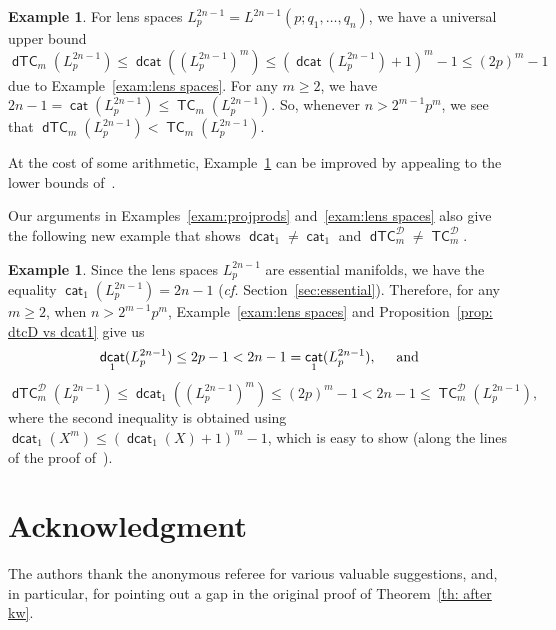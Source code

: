 \documentclass[amscd,amssymb,verbatim,11pt]{amsart}
\theoremstyle{plain}
\theoremstyle{definition}
\newtheorem{ex}[thm]{Example}
\DeclareMathOperator{\cat}{{\mathsf{cat}}}
\DeclareMathOperator{\TC}{{\mathsf{TC}}}
\DeclareMathOperator{\dcat}{{\mathsf{dcat}}}
\DeclareMathOperator{\dTC}{{\mathsf{dTC}}}
\newcommand{\D}{\mathcal{D}}
\def\Z{{\mathbb Z}}
\def\R{{\mathbb R}}
\begin{document}
\begin{ex}\label{exam: dtc and tc differ-2}
    For lens spaces $L^{2n-1}_p=L^{2n-1}(p;q_1,\ldots,q_n)$, we have a universal upper bound 
    \[
    \dTC_m(L^{2n-1}_p)\le\dcat((L^{2n-1}_p)^m)\le (\dcat(L^{2n-1}_p)+1)^m-1\le (2p)^m-1
    \]
    due to Example~\ref{exam:lens spaces}. For any $m\ge 2$, we have $2n-1=\cat(L^{2n-1}_p)\le\TC_m(L^{2n-1}_p)$. So, whenever $n>2^{m-1}p^m$, we see that $\dTC_m(L^{2n-1}_p)<\TC_m(L^{2n-1}_p)$.
\end{ex}

At the cost of some arithmetic, Example~\ref{exam: dtc and tc differ-2} can be improved by appealing to the lower bounds of~\cite{Dau}.

Our arguments in Examples~\ref{exam:projprods} and~\ref{exam:lens spaces} also give the following new example that shows $\dcat_1\ne\cat_1$ and $\dTC^{\D}_m\ne\TC^{\D}_m$.

\begin{ex}\label{ex:dim3}
%
Since the lens spaces $L^{2n-1}_p$ are essential manifolds, we have the equality $\cat_1(L^{2n-1}_p)=2n-1$ (\emph{cf.} Section~\ref{sec:essential}). Therefore, for any $m\ge 2$, when $n>2^{m-1}p^m$, Example~\ref{exam:lens spaces} and Proposition~\ref{prop: dtcD vs dcat1} give us
    \[
    \dcat_1(L^{2n-1}_p)\le 2p-1<2n-1=\cat_1(L^{2n-1}_p), \hspace{5mm} \text{and}
    \]
    \[
    \dTC^{\D}_m(L^{2n-1}_p)\le\dcat_1((L^{2n-1}_p)^m)\le (2p)^m-1<2n-1\le\TC^{\D}_m(L^{2n-1}_p),
    \]
    where the second inequality is obtained using $\dcat_1(X^m)\le (\dcat_1(X)+1)^m-1$, which is easy to show (along the lines of the proof of~\cite[Proposition~3.9]{Ja1}).
\end{ex}


\section*{Acknowledgment}
The authors thank the anonymous referee for various valuable suggestions, and, in particular, for pointing out a gap in the original proof of Theorem~\ref{th: after kw}.
\end{document}
